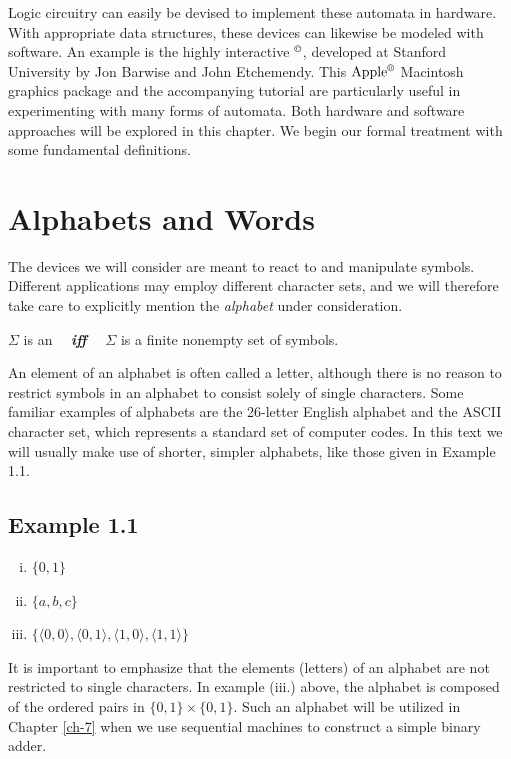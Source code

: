 Logic circuitry can easily be devised to implement these automata in hardware.
With appropriate data structures, these devices can likewise be modeled with
software. An example is the highly interactive $^{\copyright}$, developed at
Stanford University by Jon Barwise and John Etchemendy. This
$\text{Apple}\textsuperscript{\textregistered}$ Macintosh graphics package and the accompanying
tutorial are particularly useful in experimenting with many forms of automata.
Both hardware and software approaches will be explored in this chapter. We begin
our formal treatment with some fundamental definitions.

\section{Alphabets and Words}\label{sec-1.1}

The devices we will consider are meant to react to and manipulate symbols.
Different applications may employ different character sets, and we will therefore
take care to explicitly mention the \emph{alphabet} under consideration.

\begin{dfn}\label{dfn-1.1}
$\Sigma$ is an \emph{} \ \ \textbf{\emph{iff}} \ \ $\Sigma$ is a finite nonempty set of symbols.
\end{dfn}

An element of an alphabet is often called a letter, although there is no reason
to restrict symbols in an alphabet to consist solely of single characters. Some
familiar examples of alphabets are the 26-letter English alphabet and the ASCII
character set, which represents a standard set of computer codes. In this text
we will usually make use of shorter, simpler alphabets, like those given in
Example 1.1.

\subsection*{Example 1.1}
\begin{enumerate}[i.]
\item $\{0, 1\}$
\item $\{a,b,c\}$
\item $\{\langle 0, 0\rangle, \langle 0, 1\rangle, \langle 1, 0\rangle,
	\langle 1, 1\rangle \}$
\end{enumerate}

It is important to emphasize that the elements (letters) of an alphabet are not
restricted to single characters. In example (iii.) above, the alphabet is
composed of the ordered pairs in $\{0, 1\} \times \{0, 1\}$. Such an alphabet
will be utilized in Chapter \ref{ch-7} when we use sequential machines to
construct a simple binary adder.

